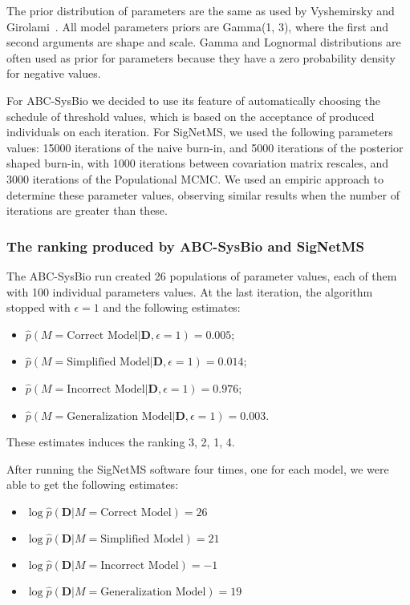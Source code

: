 The prior distribution of parameters are the same as used by Vyshemirsky
and Girolami~\cite{Vyshemirsky2007}. All model parameters priors are
Gamma(1, 3), where the first and second arguments are shape and scale. 
Gamma and Lognormal distributions are often used as prior for parameters 
because they have a zero probability density for negative values.

For ABC-SysBio we decided to use its feature of automatically choosing
the schedule of threshold values, which is based on the acceptance of
produced individuals on each iteration. For SigNetMS, we used the
following parameters values: 15000 iterations of the naive burn-in, and
5000 iterations of the posterior shaped burn-in, with 1000 iterations
between covariation matrix rescales, and 3000 iterations of the
Populational MCMC. We used an empiric approach to determine these
parameter values, observing similar results when the number of
iterations are greater than these.

\subsubsection{The ranking produced by ABC-SysBio and SigNetMS}
The ABC-SysBio run created 26 populations of parameter values, each of 
them with 100 individual parameters values. At the last iteration, the 
algorithm stopped with $\epsilon = 1$ and the following estimates: 
\begin{itemize}
    \item{$\hat{p} (M = \text{Correct Model} | {\bm D}, \epsilon = 1) =
        0.005$;}
    \item{$\hat{p} (M = \text{Simplified Model} | {\bm D}, \epsilon = 1)
        = 0.014$;} 
    \item{$\hat{p} (M = \text{Incorrect Model} | {\bm D}, \epsilon = 1)
        = 0.976$;}
    \item{$\hat{p} (M = \text{Generalization Model} | {\bm D}, \epsilon
        = 1) = 0.003$.}
\end{itemize}
These estimates induces the ranking 3, 2, 1, 4.

After running the SigNetMS software four times, one for each model, we
were able to get the following estimates:
\begin{itemize}
    \item{$\log \hat{p}({\bm D} | M = \text{Correct Model}) = 26$}
    \item{$\log \hat{p}({\bm D} | M = \text{Simplified Model}) = 21$}
    \item{$\log \hat{p}({\bm D} | M = \text{Incorrect Model}) = -1$}
    \item{$\log \hat{p}({\bm D} | M = \text{Generalization Model}) =
        19$}
\end{itemize}

